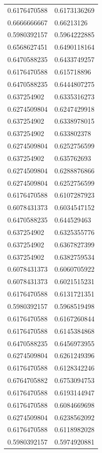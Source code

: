 \begin{longtable}{@{}ll@{}}
		0.6176470588 & 0.6173136269 \\
		0.6666666667 & 0.66213126   \\
		0.5980392157 & 0.5964222885 \\
		0.6568627451 & 0.6490118164 \\
		0.6470588235 & 0.6433749257 \\
		0.6176470588 & 0.615718896  \\
		0.6470588235 & 0.6444807275 \\
		0.637254902  & 0.6335316273 \\
		0.6274509804 & 0.6247429918 \\
		0.637254902  & 0.6338978015 \\
		0.637254902  & 0.633802378  \\
		0.6274509804 & 0.6252756599 \\
		0.637254902  & 0.635762693  \\
		0.6274509804 & 0.6288876866 \\
		0.6274509804 & 0.6252756599 \\
		0.6176470588 & 0.6107287923 \\
		0.6078431373 & 0.6034547152 \\
		0.6470588235 & 0.644529463  \\
		0.637254902  & 0.6325355776 \\
		0.637254902  & 0.6367827399 \\
		0.637254902  & 0.6382759534 \\
		0.6078431373 & 0.6060705922 \\
		0.6078431373 & 0.6021515231 \\
		0.6176470588 & 0.6131721351 \\
		0.5980392157 & 0.5968519498 \\
		0.6176470588 & 0.6167260844 \\
		0.6176470588 & 0.6145384868 \\
		0.6470588235 & 0.6456973955 \\
		0.6274509804 & 0.6261249396 \\
		0.6176470588 & 0.6128342246 \\
		0.6764705882 & 0.6753094753 \\
		0.6176470588 & 0.6193144947 \\
		0.6176470588 & 0.6084669698 \\
		0.6274509804 & 0.6238562092 \\
		0.6176470588 & 0.6118982028 \\
		0.5980392157 & 0.5974920881 \\

\end{longtable}
